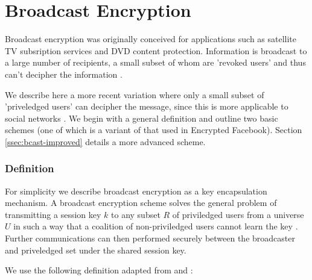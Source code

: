 \chapter{Broadcast Encryption}


Broadcast encryption was originally conceived for applications such as satellite TV subsription services and DVD content protection. Information is broadcast to a large number of recipients, a small subset of whom are 'revoked users' and thus can't decipher the information \cite{fiat-naor}.

We describe here a more recent variation where only a small subset of 'priveledged users' can decipher the message, since this is more applicable to social networks \cite{XXX}. We begin with a general definition and outline two basic schemes (one of which is a variant of that used in Encrypted Facebook). Section \ref{ssec:bcast-improved} details a more advanced scheme.


\subsection{Definition}

For simplicity we describe broadcast encryption as a key encapsulation mechanism. A broadcast encryption scheme solves the general problem of transmitting a session key $k$ to any subset $R$ of priviledged users from a universe $U$ in such a way that a coalition of non-priviledged users cannot learn the key \cite{fiat-naor}. Further communications can then performed securely between the broadcaster and priveledged set under the shared session key.

We use the following definition adapted from \cite{fiat-naor} and \cite{boneh}:

